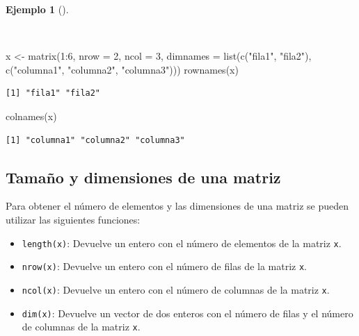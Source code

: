 \documentclass[
  a4paper,
]{scrreport}
\newenvironment{Shaded}{\begin{snugshade}}{\end{snugshade}}
\newcommand{\AttributeTok}[1]{\textcolor[rgb]{0.40,0.45,0.13}{#1}}
\newcommand{\DecValTok}[1]{\textcolor[rgb]{0.68,0.00,0.00}{#1}}
\newcommand{\FunctionTok}[1]{\textcolor[rgb]{0.28,0.35,0.67}{#1}}
\newcommand{\NormalTok}[1]{\textcolor[rgb]{0.00,0.23,0.31}{#1}}
\newcommand{\OtherTok}[1]{\textcolor[rgb]{0.00,0.23,0.31}{#1}}
\newcommand{\SpecialCharTok}[1]{\textcolor[rgb]{0.37,0.37,0.37}{#1}}
\newcommand{\StringTok}[1]{\textcolor[rgb]{0.13,0.47,0.30}{#1}}
\providecommand{\tightlist}{%
  \setlength{\itemsep}{0pt}\setlength{\parskip}{0pt}}\usepackage{longtable,booktabs,array}
\theoremstyle{definition}
\theoremstyle{definition}
\newtheorem{example}{Ejemplo}[chapter]
\theoremstyle{remark}
\begin{document}
\begin{example}[]\protect\hypertarget{exm-obtencion-nombres-matriz}{}\label{exm-obtencion-nombres-matriz}

~

\begin{Shaded}
\begin{Highlighting}[]
\NormalTok{x }\OtherTok{\textless{}{-}} \FunctionTok{matrix}\NormalTok{(}\DecValTok{1}\SpecialCharTok{:}\DecValTok{6}\NormalTok{, }\AttributeTok{nrow =} \DecValTok{2}\NormalTok{, }\AttributeTok{ncol =} \DecValTok{3}\NormalTok{, }\AttributeTok{dimnames =} \FunctionTok{list}\NormalTok{(}\FunctionTok{c}\NormalTok{(}\StringTok{"fila1"}\NormalTok{, }\StringTok{"fila2"}\NormalTok{), }\FunctionTok{c}\NormalTok{(}\StringTok{"columna1"}\NormalTok{, }\StringTok{"columna2"}\NormalTok{, }\StringTok{"columna3"}\NormalTok{)))}
\FunctionTok{rownames}\NormalTok{(x)}
\end{Highlighting}
\end{Shaded}

\begin{verbatim}
[1] "fila1" "fila2"
\end{verbatim}

\begin{Shaded}
\begin{Highlighting}[]
\FunctionTok{colnames}\NormalTok{(x)}
\end{Highlighting}
\end{Shaded}

\begin{verbatim}
[1] "columna1" "columna2" "columna3"
\end{verbatim}

\end{example}

\subsection{Tamaño y dimensiones de una
matriz}\label{tamauxf1o-y-dimensiones-de-una-matriz}

Para obtener el número de elementos y las dimensiones de una matriz se
pueden utilizar las siguientes funciones:

\begin{itemize}
\tightlist
\item
  \texttt{length(x)}: Devuelve un entero con el número de elementos de
  la matriz \texttt{x}.
\item
  \texttt{nrow(x)}: Devuelve un entero con el número de filas de la
  matriz \texttt{x}.
\item
  \texttt{ncol(x)}: Devuelve un entero con el número de columnas de la
  matriz \texttt{x}.
\item
  \texttt{dim(x)}: Devuelve un vector de dos enteros con el número de
  filas y el número de columnas de la matriz \texttt{x}.
\end{itemize}
\end{document}

